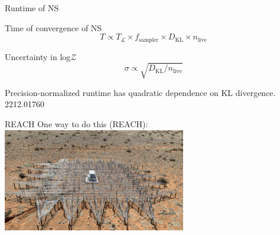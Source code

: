 \documentclass[aspectratio=169]{beamer}
\begin{document}
\begin{frame}{Runtime of NS}

\begin{block}{Time of convergence of NS}
    \begin{equation}
        T \propto T_{\mathcal{L}} \times f_{\textrm{sampler}} \times D_{\textrm{KL}} \times n_{\textrm{live}} 
    \end{equation}
\end{block}
\begin{block}{Uncertainty in log$\mathcal{Z}$}
    \begin{equation}
        \sigma \propto \sqrt{D_{\textrm{KL}} / n_{\textrm{live}}}
    \end{equation}
\end{block}

\alert{Precision-normalized} runtime has quadratic dependence on KL divergence. \textcolor{cfgrey}{2212.01760}
    
\end{frame}

\begin{frame}{REACH}
\vspace{2em}
One way to do this (REACH):
\vfill
\centering
\includegraphics[width=0.6\textwidth]{Ca_Foscari Beamer/antenna.png}

\end{frame}
\end{document}
